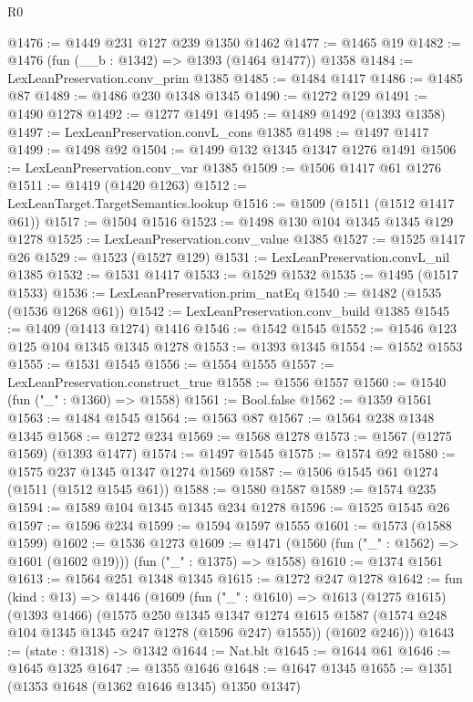 \begin{lexlean}{R0}
\begin{coremodule}
@1476 := @1449 @231 @127 @239 @1350 @1462
@1477 := @1465 @19
@1482 := @1476 (fun (__b : @1342) => @1393 (@1464 @1477)) @1358
@1484 := LexLeanPreservation.conv_prim @1385
@1485 := @1484 @1417
@1486 := @1485 @87
@1489 := @1486 @230 @1348 @1345
@1490 := @1272 @129
@1491 := @1490 @1278
@1492 := @1277 @1491
@1495 := @1489 @1492 (@1393 @1358)
@1497 := LexLeanPreservation.convL_cons @1385
@1498 := @1497 @1417
@1499 := @1498 @92
@1504 := @1499 @132 @1345 @1347 @1276 @1491
@1506 := LexLeanPreservation.conv_var @1385
@1509 := @1506 @1417 @61 @1276
@1511 := @1419 (@1420 @1263)
@1512 := LexLeanTarget.TargetSemantics.lookup
@1516 := @1509 (@1511 (@1512 @1417 @61))
@1517 := @1504 @1516
@1523 := @1498 @130 @104 @1345 @1345 @129 @1278
@1525 := LexLeanPreservation.conv_value @1385
@1527 := @1525 @1417 @26
@1529 := @1523 (@1527 @129)
@1531 := LexLeanPreservation.convL_nil @1385
@1532 := @1531 @1417
@1533 := @1529 @1532
@1535 := @1495 (@1517 @1533)
@1536 := LexLeanPreservation.prim_natEq
@1540 := @1482 (@1535 (@1536 @1268 @61))
@1542 := LexLeanPreservation.conv_build @1385
@1545 := @1409 (@1413 @1274) @1416
@1546 := @1542 @1545
@1552 := @1546 @123 @125 @104 @1345 @1345 @1278
@1553 := @1393 @1345
@1554 := @1552 @1553
@1555 := @1531 @1545
@1556 := @1554 @1555
@1557 := LexLeanPreservation.construct_true
@1558 := @1556 @1557
@1560 := @1540 (fun ("_" : @1360) => @1558)
@1561 := Bool.false
@1562 := @1359 @1561
@1563 := @1484 @1545
@1564 := @1563 @87
@1567 := @1564 @238 @1348 @1345
@1568 := @1272 @234
@1569 := @1568 @1278
@1573 := @1567 (@1275 @1569) (@1393 @1477)
@1574 := @1497 @1545
@1575 := @1574 @92
@1580 := @1575 @237 @1345 @1347 @1274 @1569
@1587 := @1506 @1545 @61 @1274 (@1511 (@1512 @1545 @61))
@1588 := @1580 @1587
@1589 := @1574 @235
@1594 := @1589 @104 @1345 @1345 @234 @1278
@1596 := @1525 @1545 @26
@1597 := @1596 @234
@1599 := @1594 @1597 @1555
@1601 := @1573 (@1588 @1599)
@1602 := @1536 @1273
@1609 := @1471 (@1560 (fun ("_" : @1562) => @1601 (@1602 @19))) (fun ("_" : @1375) => @1558)
@1610 := @1374 @1561
@1613 := @1564 @251 @1348 @1345
@1615 := @1272 @247 @1278
@1642 := fun (kind : @13) =>
  @1446
    (@1609
      (fun ("_" : @1610) =>
      @1613
        (@1275 @1615)
        (@1393 @1466)
        (@1575
          @250
          @1345
          @1347
          @1274
          @1615
          @1587
          (@1574 @248 @104 @1345 @1345 @247 @1278 (@1596 @247) @1555))
        (@1602 @246)))
@1643 := (state : @1318) -> @1342
@1644 := Nat.blt
@1645 := @1644 @61
@1646 := @1645 @1325
@1647 := @1355 @1646
@1648 := @1647 @1345
@1655 := @1351 (@1353 @1648 (@1362 @1646 @1345) @1350 @1347)

\end{coremodule}
\end{lexlean}
